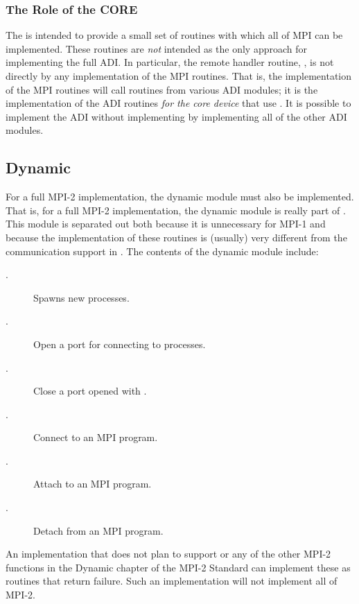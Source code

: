 \documentclass{article}
\begin{document}
\subsubsection{The Role of the CORE}
The  is intended to provide a small set of routines
with which all of MPI can be implemented.  These routines are
\emph{not} intended as the only approach for implementing the full
ADI.  In particular, the remote handler routine, , is
not directly by any implementation of the MPI routines.  That is, the
implementation of the MPI routines will call routines from various ADI
modules; it is the implementation of the ADI routines \emph{for the
core device} that use .  It is possible to implement
the ADI without implementing  by implementing all of
the other ADI modules.

\subsection{Dynamic}
For a full MPI-2 implementation, the dynamic module must also be
implemented.  That is, for a full MPI-2 implementation, the dynamic
module is really part of .  This module is separated
out both because it is unnecessary for MPI-1 and because the
implementation of these routines is (usually) very different from the
communication support in .  The contents of the
dynamic module include:

\begin{description}
\item[.] Spawns new processes.
\item[.] Open a port for connecting to processes. 
\item[.] Close a port opened with .
\item[.] Connect to an MPI program.
\item[.] Attach to an MPI program.
\item[.] Detach from an MPI program.
\end{description}
An implementation that does not plan to support  or
any of the other MPI-2 functions in the Dynamic chapter of the MPI-2 Standard
can implement these as routines that return failure.  Such an implementation
will not implement all of MPI-2. 
\end{document}
